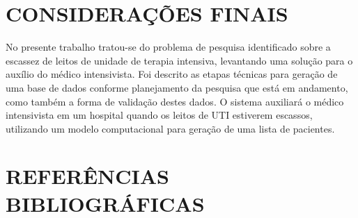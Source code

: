 \documentclass[12pt]{article}
\begin{document}
\section{CONSIDERAÇÕES FINAIS}
No presente trabalho tratou-se do problema de pesquisa identificado sobre a escassez de leitos de unidade de terapia intensiva, levantando uma solução para o auxílio do médico intensivista.
Foi descrito as etapas técnicas para geração de uma base de dados conforme planejamento da pesquisa que está em andamento, como também a forma de validação destes dados.
O sistema auxiliará o médico intensivista em um hospital quando os leitos de UTI estiverem escassos, utilizando um modelo computacional para geração de uma lista de pacientes.

\section{REFERÊNCIAS BIBLIOGRÁFICAS}



\end{document}
